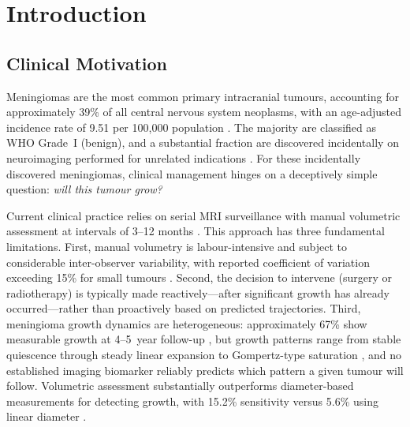 \section{Introduction}
\label{sec:introduction}

\subsection{Clinical Motivation}
\label{sec:intro:clinical}

Meningiomas are the most common primary intracranial tumours, accounting for
approximately 39\% of all central nervous system neoplasms, with an
age-adjusted incidence rate of 9.51 per 100,000 population
\cite{ostrom2023brain}. The majority are classified as WHO Grade~I (benign),
and a substantial fraction are discovered incidentally on neuroimaging
performed for unrelated indications \cite{vernooij2007incidental}. For these
incidentally discovered meningiomas, clinical management hinges on a
deceptively simple question: \emph{will this tumour grow?}

Current clinical practice relies on serial MRI surveillance with manual
volumetric assessment at intervals of 3--12 months
\cite{hashimoto2012natural,ius2020management}. This approach has three
fundamental limitations. First, manual volumetry is labour-intensive and
subject to considerable inter-observer variability, with reported coefficient
of variation exceeding 15\% for small tumours \cite{defined2016interobserver}.
Second, the decision to intervene (surgery or radiotherapy) is typically made
reactively---after significant growth has already occurred---rather than
proactively based on predicted trajectories. Third, meningioma growth dynamics
are heterogeneous: approximately 67\% show measurable growth at 4--5~year
follow-up \cite{hashimoto2012natural}, but growth patterns range from stable
quiescence through steady linear expansion to Gompertz-type saturation
\cite{engelhardt2023gompertz,fountain2017growth}, and no established imaging
biomarker reliably predicts which pattern a given tumour will follow.
Volumetric assessment substantially outperforms diameter-based measurements for
detecting growth, with 15.2\% sensitivity versus 5.6\% using linear diameter
\cite{benjamin2021volumetric}.


